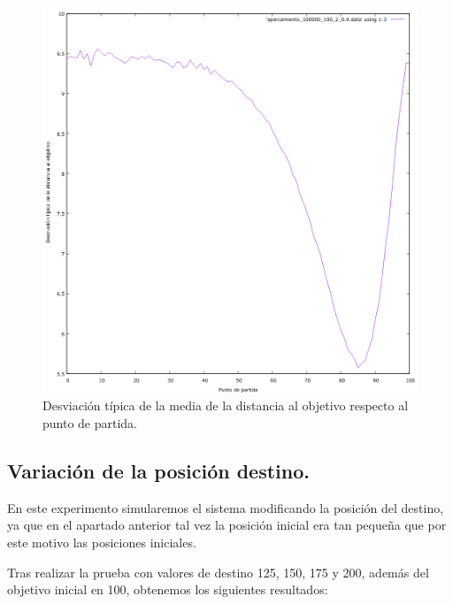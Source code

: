 \documentclass[12pt, spanish]{article}
\begin{document}
\begin{figure}[H]
	\centering
	\includegraphics[scale = 0.6]{aparcamiento_desv_100000_100_2_0-9.png}
	\caption{Desviación típica de la media de la distancia al objetivo respecto al punto de partida.}
	\label{fig:ej4}
\end{figure}

\subsection{Variación de la posición destino.}

En este experimento simularemos el sistema modificando la posición del destino, ya que en el apartado anterior tal vez la posición inicial era tan pequeña que por este motivo las posiciones iniciales.


Tras realizar la prueba con valores de destino 125, 150, 175 y 200, además del objetivo inicial en 100, obtenemos los siguientes resultados:
\end{document}
